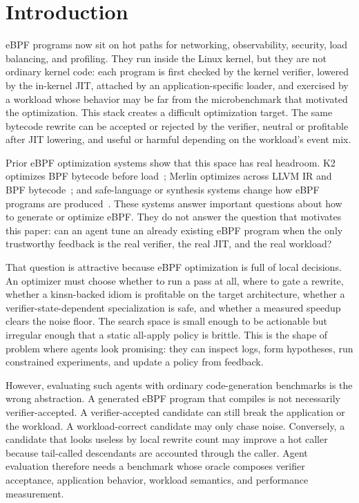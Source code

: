 \section{Introduction}
\label{sec:introduction}

eBPF programs now sit on hot paths for networking, observability, security, load balancing, and profiling. They run inside the Linux kernel, but they are not ordinary kernel code: each program is first checked by the kernel verifier, lowered by the in-kernel JIT, attached by an application-specific loader, and exercised by a workload whose behavior may be far from the microbenchmark that motivated the optimization. This stack creates a difficult optimization target. The same bytecode rewrite can be accepted or rejected by the verifier, neutral or profitable after JIT lowering, and useful or harmful depending on the workload's event mix.

Prior eBPF optimization systems show that this space has real headroom. K2 optimizes BPF bytecode before load~\cite{xu2021synthesizing}; Merlin optimizes across LLVM IR and BPF bytecode~\cite{mao2024merlin}; and safe-language or synthesis systems change how eBPF programs are produced~\cite{jia2025rex,zheng2024kgent}. These systems answer important questions about how to generate or optimize eBPF. They do not answer the question that motivates this paper: can an agent tune an already existing eBPF program when the only trustworthy feedback is the real verifier, the real JIT, and the real workload?

That question is attractive because eBPF optimization is full of local decisions. An optimizer must choose whether to run a pass at all, where to gate a rewrite, whether a kinsn-backed idiom is profitable on the target architecture, whether a verifier-state-dependent specialization is safe, and whether a measured speedup clears the noise floor. The search space is small enough to be actionable but irregular enough that a static all-apply policy is brittle. This is the shape of problem where agents look promising: they can inspect logs, form hypotheses, run constrained experiments, and update a policy from feedback.

However, evaluating such agents with ordinary code-generation benchmarks is the wrong abstraction. A generated eBPF program that compiles is not necessarily verifier-accepted. A verifier-accepted candidate can still break the application or the workload. A workload-correct candidate may only chase noise. Conversely, a candidate that looks useless by local rewrite count may improve a hot caller because tail-called descendants are accounted through the caller. Agent evaluation therefore needs a benchmark whose oracle composes verifier acceptance, application behavior, workload semantics, and performance measurement.

